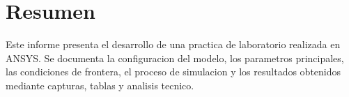 \section*{Resumen}
Este informe presenta el desarrollo de una practica de laboratorio realizada en ANSYS. Se documenta la configuracion del modelo, los parametros principales, las condiciones de frontera, el proceso de simulacion y los resultados obtenidos mediante capturas, tablas y analisis tecnico.

\begin{infobox}
\end{infobox}
